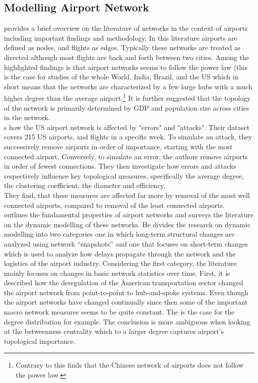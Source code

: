 \subsection{Modelling Airport Network}
\citet[pp. 41-42]{costa2011analyzing} provides a brief overview on the literature of networks in the context of airports including important findings and methodology. In this literature airports are defined as nodes, and flights as edges. Typically these networks are treated as directed although most flights are back and forth between two cities. Among the highlighted findings is that airport networks seems to follow the power law (this is the case for studies of the whole World, India, Brazil, and the US which in short means that the networks are characterized by a few large hubs with a much higher degree than the average airport.\footnote{Contrary to this \citet{he2004statistics} finds that the Chinese network of airports does not follow the power law.} It is further suggested that the topology of the network is primarily determined by GDP and population size across cities in the network. \\
\citet{chi2004structural} s how the US airport network is affected by "errors" and "attacks". Their dataset covers 215 US airports, and flights in a specific week. To simulate an attack, they successively remove airports in order of importance, starting with the most connected airport. Conversely, to simulate an error, the authors remove airports in order of fewest connections. They then investigate how errors and attacks respectively influence key topological measures, specifically the average degree, the clustering coefficient, the diameter and efficiency. \\
They find, that these measures are affected far more by removal of the most well connected airports, compared to removal of the least connected airports. \\
\citet{rocha2017dynamics} outlines the fundamental properties of airport networks and surveys the literature on the dynamic modelling of these networks. He divides the research on dynamic modelling into two categories one in which long-term structural changes are analyzed using network ``snapshots'' and one that focuses on short-term changes which is used to analyze how delays propagate through the network and the logistics of the airport industry. Considering the first category, the literature mainly focuses on changes in basic network statistics over time. First, it is described how the deregulation of the American transportation sector changed the airport network from point-to-point to hub-and-spoke systems. Even though the airport networks have changed continually since then some of the important macro network measures seems to be quite constant. The is the case for the degree distribution for example. The conclusion is more ambiguous when looking at the betweenness centrality which to a larger degree captures airport's topological importance. 


 